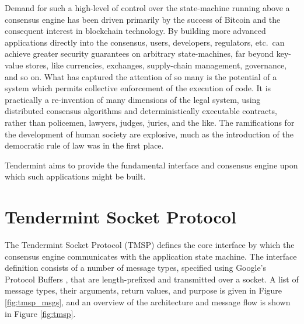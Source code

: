 Demand for such a high-level of control over the state-machine running above a consensus engine has been driven primarily by the success of Bitcoin and the consequent interest in blockchain technology.
By building more advanced applications directly into the consensus, 
users, developers, regulators, etc.~can achieve greater security guarantees on arbitrary state-machines, 
far beyond key-value stores, like currencies, exchanges, supply-chain management, governance, and so on.
What has captured the attention of so many is the potential of a system which permits collective enforcement of the execution of code.
It is practically a re-invention of many dimensions of the legal system, using distributed consensus algorithms and deterministically executable contracts,
rather than policemen, lawyers, judges, juries, and the like.
The ramifications for the development of human society are explosive, much as the introduction of the democratic rule of law was in the first place.

Tendermint aims to provide the fundamental interface and consensus engine upon which such applications might be built.

\section{Tendermint Socket Protocol}

The Tendermint Socket Protocol (TMSP) defines the core interface by which the consensus engine communicates with the application state machine.
The interface definition consists of a number of message types, specified using Google's Protocol Buffers \cite{protobuf}, 
that are length-prefixed and transmitted over a socket. 
A list of message types, their arguments, return values, and purpose is given in Figure \ref{fig:tmsp_msgs},
and an overview of the architecture and message flow is shown in Figure \ref{fig:tmsp}.

